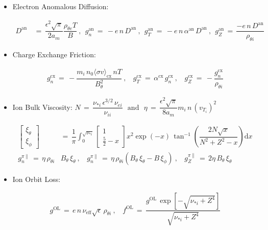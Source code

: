 \documentclass[a4paper,8pt]{article}
\providecommand{\tightlist}{%
  \setlength{\itemsep}{0pt}\setlength{\parskip}{0pt}}
\begin{document}
\begin{itemize}
\tightlist
\item
  Electron Anomalous Diffusion: \small

  \begin{align}
  D^\text{an} \,&=\, \dfrac{\epsilon^2 \sqrt{\pi}}{2 a_m} \dfrac{\rho_{\theta e} T}{B}~,~~ g_n^\text{an} \,=\, -e \,n\, D^\text{an}~,~~ g_T^\text{an} \,=\, -e \,n\, \alpha^\text{an}\, D^\text{an}~,~~ g_Z^\text{an} \,=\, \dfrac{-e \,n\, D^\text{an}}{\rho_{\theta i}}
  \end{align}

  \normalsize
\item
  Charge Exchange Friction: \small

  \begin{align}
  g_n^\text{cx} \,=\, -\dfrac{m_i \,n_0 \langle\sigma v\rangle_\text{cx} \,n T}{B_\theta^2}~,~~~~ g_T^\text{cx} \,=\, \alpha^\text{cx}\,g_n^\text{cx}~,~~~~ g_Z^\text{cx} \,=\, -\dfrac{g_n^\text{cx}}{\rho_{\theta i}}
  \end{align}

  \normalsize
\item
  Ion Bulk Viscosity:
  \(N \,=\, \dfrac{\nu_{*i}\,\epsilon^{3/2}\,\nu_{ei}}{\nu_{ii}} ~~~\text{and}~~~ \eta \,=\, \dfrac{\epsilon^2 \sqrt{\pi}}{8 a_m} m_i \,n\, (v_{T_i})^2\)
  \small

  \begin{align}
  \begin{bmatrix}\xi_\theta \\[1ex] \xi_\phi \end{bmatrix} \,&=\, \dfrac{1}{\pi} \int_0^{\sqrt{\nu_{*i}}} \begin{bmatrix} 1 \\[1ex] \frac{5}{2} - x \end{bmatrix} x^2 \exp(-x) \, \tan^{-1}\left(\dfrac{2 N \sqrt{x}}{N^2 + Z^2 - x}\right) \text{d}x \\
  g_n^{\pi\parallel} \,=\, \eta \, \rho_{\theta i}& B_\theta \, \xi_\theta~,~~~~ g_n^{\pi\parallel} \,=\, \eta \, \rho_{\theta i} \left(B_\theta\,\xi_\theta - B\,\xi_\phi\right)~,~~~~ g_Z^{\pi\parallel} \,=\, 2\eta \, B_\theta \, \xi_\theta
  \end{align}

  \normalsize
\end{itemize}

\begin{itemize}
\tightlist
\item
  Ion Orbit Loss: \small

  \begin{align}
  g^\text{OL} \,=\, e \,n\, \nu_\text{eff} \sqrt{\epsilon} \,\rho_{\theta i}~,~~~~ f^\text{OL} \,=\, \dfrac{g^\text{OL}\,\exp\left[-\sqrt{\nu_{*i} + Z^4}\right]}{\sqrt{\nu_{*i} + Z^4}}
  \end{align}

  \normalsize
\end{itemize}
\end{document}
